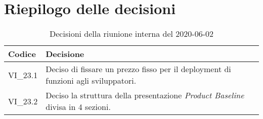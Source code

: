 \section{Riepilogo delle decisioni}
\begin{longtable}{ 
	 >{\centering}p{} >{}p{} }
	
	\caption{Decisioni della riunione interna del 2020-06-02}\\	
	
	\textbf{\color{white}Codice} & 
	\textbf{\color{white}Decisione} 
	\tabularnewline  
	\endhead
	
	VI\_23.1 & Deciso di fissare un prezzo fisso per il deployment di funzioni agli sviluppatori. \\
	VI\_23.2 & Deciso la struttura della presentazione \textit{Product Baseline} divisa in 4 sezioni. \\
\end{longtable}
